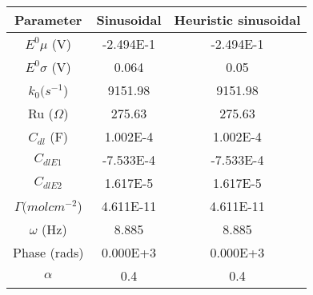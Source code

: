 \documentclass[preview]{standalone}
\begin{document}
\begin{center}
\begin{tabular}{|c|c|c|}
\hline
Parameter & Sinusoidal & Heuristic sinusoidal\\
\hline\hline
$E^0 \mu$ (V) & -2.494E-1 & -2.494E-1 \\
\hline
$E^0 \sigma$ (V) & 0.064 & 0.05 \\
\hline
$k_0 (s^{-1}$) & 9151.98 & 9151.98 \\
\hline
Ru ($\Omega$) & 275.63 & 275.63 \\
\hline
$C_{dl}$ (F) & 1.002E-4 & 1.002E-4 \\
\hline
$C_{dlE1}$& -7.533E-4 & -7.533E-4 \\
\hline
$C_{dlE2}$& 1.617E-5 & 1.617E-5 \\
\hline
$\Gamma (mol cm^{-2}$) & 4.611E-11 & 4.611E-11 \\
\hline
$\omega$ (Hz) & 8.885 & 8.885 \\
\hline
Phase (rads) & 0.000E+3 & 0.000E+3 \\
\hline
$\alpha$& 0.4 & 0.4 \\
\hline
\end{tabular}
\end{center}
\end{document}
